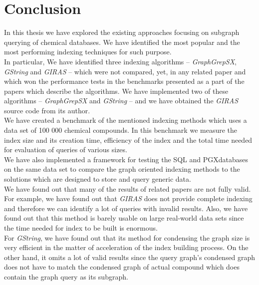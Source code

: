 \chapter*{Conclusion}

In this thesis we have explored the existing approaches focusing on subgraph querying of chemical databases. We have identified the most popular and the most performing indexing techniques for such purpose.\\

In particular, We have identified three indexing algorithms -- \textit{GraphGrepSX}, \textit{GString} and \textit{GIRAS} -- which were not compared, yet, in any related paper and which won the performance tests in the benchmarks presented as a part of the papers which describe the algorithms. We have implemented two of these algorithms -- \textit{GraphGrepSX} and \textit{GString} -- and we have obtained the \textit{GIRAS} source code from its author.\\

We have created a benchmark of the mentioned indexing methods which uses a data set of 100 000 chemical compounds. In this benchmark we measure the index size and its creation time, efficiency of the index and the total time needed for evaluation of queries of various sizes.\\

We have also implemented a framework for testing the SQL and PGX\linebreak databases on the same data set to compare the graph oriented indexing methods to the solutions which are designed to store and query generic data.\\

We have found out that many of the results of related papers are not fully valid. For example, we have found out that \textit{GIRAS} does not provide complete indexing and therefore we can identify a lot of queries with invalid results. Also, we have found out that this method is barely usable on large real-world data sets since the time needed for index to be built is enormous.\\

For \textit{GString}, we have found out that its method for condensing the graph size is very efficient in the matter of acceleration of the index building process. On the other hand, it omits a lot of valid results since the query graph's condensed graph does not have to match the condensed graph of actual compound which does contain the graph query as its subgraph.\\

